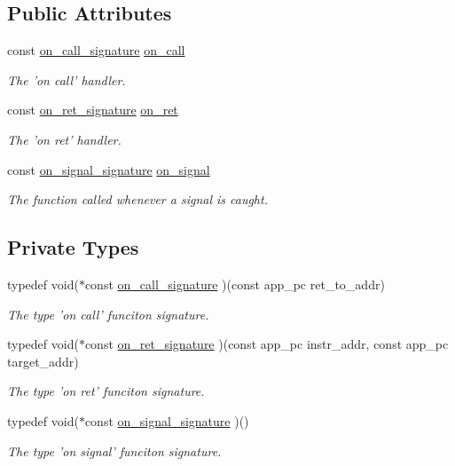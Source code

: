 \subsection*{Public Attributes}
\begin{DoxyCompactItemize}
\item 
const \hyperlink{class_s_s_handlers_a7dfce2bdabde106253c02c2c012c1ea1}{on\-\_\-call\-\_\-signature} \hyperlink{class_s_s_handlers_a2cd9221058871db09200f523f78bfb03}{on\-\_\-call}
\begin{DoxyCompactList}\small\item\em The 'on call' handler. \end{DoxyCompactList}\item 
const \hyperlink{class_s_s_handlers_ac88de91ef7a6133f1836e4e7413ee5a1}{on\-\_\-ret\-\_\-signature} \hyperlink{class_s_s_handlers_a2044718e6183b14442c9bc9295b3dda2}{on\-\_\-ret}
\begin{DoxyCompactList}\small\item\em The 'on ret' handler. \end{DoxyCompactList}\item 
const \hyperlink{class_s_s_handlers_ad3cf1de404b14193c28b3247f6a88d73}{on\-\_\-signal\-\_\-signature} \hyperlink{class_s_s_handlers_a9933cca29ab671706a5df494e3fb3532}{on\-\_\-signal}
\begin{DoxyCompactList}\small\item\em The function called whenever a signal is caught. \end{DoxyCompactList}\end{DoxyCompactItemize}
\subsection*{Private Types}
\begin{DoxyCompactItemize}
\item 
typedef void($\ast$const \hyperlink{class_s_s_handlers_a7dfce2bdabde106253c02c2c012c1ea1}{on\-\_\-call\-\_\-signature} )(const app\-\_\-pc ret\-\_\-to\-\_\-addr)
\begin{DoxyCompactList}\small\item\em The type 'on call' funciton signature. \end{DoxyCompactList}\item 
typedef void($\ast$const \hyperlink{class_s_s_handlers_ac88de91ef7a6133f1836e4e7413ee5a1}{on\-\_\-ret\-\_\-signature} )(const app\-\_\-pc instr\-\_\-addr, const app\-\_\-pc target\-\_\-addr)
\begin{DoxyCompactList}\small\item\em The type 'on ret' funciton signature. \end{DoxyCompactList}\item 
typedef void($\ast$const \hyperlink{class_s_s_handlers_ad3cf1de404b14193c28b3247f6a88d73}{on\-\_\-signal\-\_\-signature} )()
\begin{DoxyCompactList}\small\item\em The type 'on signal' funciton signature. \end{DoxyCompactList}\end{DoxyCompactItemize}


